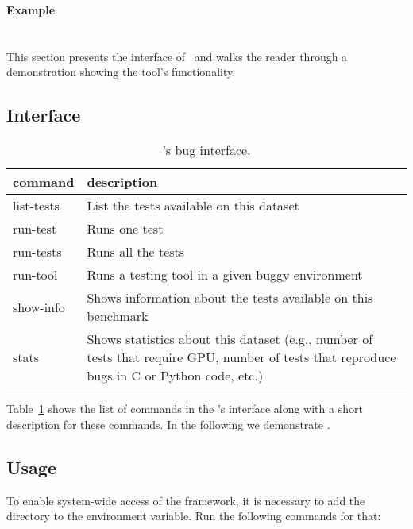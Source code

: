 \documentclass[sigconf,screen]{acmart}
\begin{document}
\textbf{Example}~ 

\section{\tname} %

This section presents the interface of \tname\ and walks the reader
through a demonstration showing the tool's functionality.


\subsection{Interface}

\begin{table}
  \centering
  \caption{\label{table:bug-interface}\tname's bug interface.}
\begin{tabular}{lp{6.5cm}}
  \toprule
  \textbf{command} & \textbf{description} \\
  \midrule
list-tests & List the tests available on this dataset\\
run-test & Runs one test\\
run-tests & Runs all the tests\\
run-tool & Runs a testing tool in a given buggy environment \\
show-info & Shows information about the tests available on this benchmark\\
stats & Shows statistics about this dataset (e.g., number of tests
that require GPU, number of tests that reproduce bugs in C or Python
code, etc.)\\
\bottomrule
\end{tabular}
\end{table}

Table~\ref{table:bug-interface} shows the list of commands in the
\tname's interface along with a short description for these
commands. In the following we demonstrate \tname.

\subsection{Usage}

To enable system-wide access of the framework, it is necessary to add
the directory  to the  environment
variable. Run the following commands for that:
\end{document}
